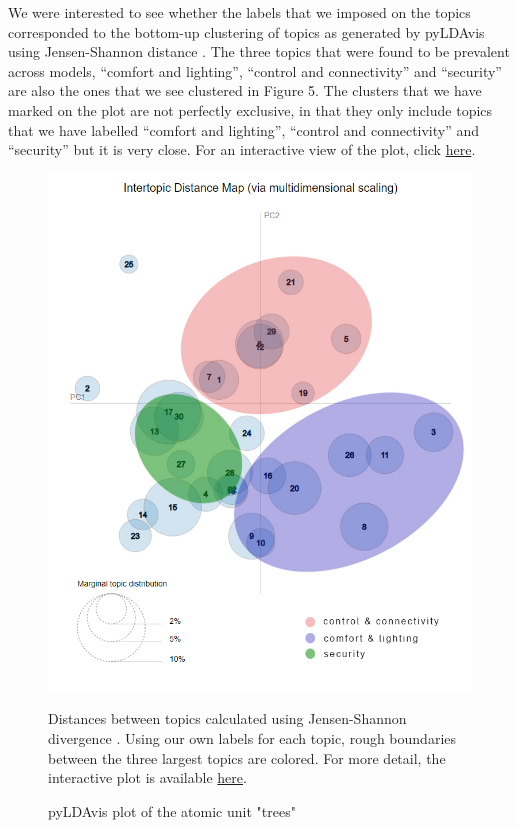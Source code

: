 \documentclass{article}
\begin{document}
    We were interested to see whether the labels that we imposed on the topics corresponded to the bottom-up clustering of topics as generated by pyLDAvis using Jensen-Shannon distance \cite{sievert2014ldavis}. The three topics that were found to be prevalent across models, “comfort and lighting”, “control and connectivity” and “security” are also the ones that we see clustered in Figure 5. The clusters that we have marked on the plot are not perfectly exclusive, in that they only include topics that we have labelled “comfort and lighting”, “control and connectivity” and “security” but it is very close. For an interactive view of the plot, click \href{https://tinyurl.com/y9ncgo5b}{here}.
    
    \begin{figure}[H]
        \begin{centering}
        \includegraphics[width = \textwidth]{../Figure/pyLDAvis_edit.jpg}
        \caption{pyLDAvis plot of the atomic unit "trees"}
        \end{centering}
        \begin{footnotesize} 
            Distances between topics calculated using Jensen-Shannon divergence \cite{sievert2014ldavis}. Using our own labels for each topic, rough boundaries between the three largest topics are colored. For more detail, the interactive plot is available \href{https://tinyurl.com/y9ncgo5b}{here}.
        \end{footnotesize}
    \end{figure}
    
\end{document}
